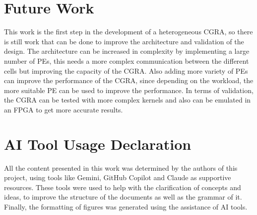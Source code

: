 \documentclass[conference]{IEEEtran}
\begin{document}

\section{Future Work}

This work is the first step in the development of a heterogeneous CGRA, so there is still work that can be done to improve the architecture and validation of the design. 
The architecture can be increased in complexity by implementing a large number of PEs, this needs a more complex communication between the different cells but improving the capacity of the CGRA.
Also adding more variety of PEs can improve the performance of the CGRA, since depending on the workload, the more suitable PE can be used to improve the performance. 
In terms of validation, the CGRA can be tested with more complex kernels and also can be emulated in an FPGA to get more accurate results.



\section*{AI Tool Usage Declaration}

All the content presented in this work was determined by the authors of this project, using tools like Gemini, GitHub Copilot and Claude as supportive resources.
These tools were used to help with the clarification of concepts and ideas, to improve the structure of the documents as well as the grammar of it.
Finally, the formatting of figures was generated using the assistance of AI tools. 




\end{document}
